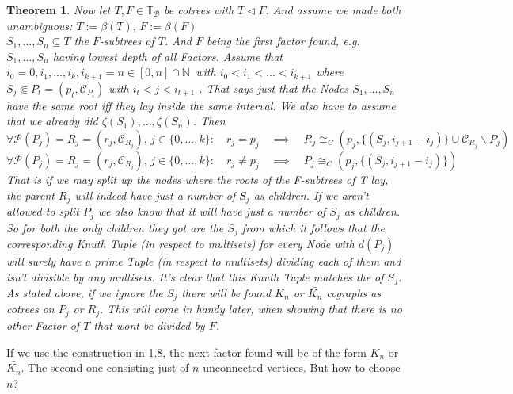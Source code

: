 \documentclass[a4paper,12pt]{article}
\newtheorem{theorem}{Theorem}[section]
\theoremstyle{definition}
\begin{document}
		\begin{theorem}
				Now let $T,F\in\mathds{T}_{\mathcal{B}} $ be cotrees with $T\vartriangleleft F$. And assume we made both unambiguous: $T:= \beta(T), \, F:=\beta(F)$\\ 	$S_1,...,S_n\subseteq T$ the $F$-subtrees of $T$. And $F$ being the first factor found, e.g. $S_1,...,S_n$ having lowest depth of all Factors. Assume that $i_0=0,i_1,...,i_k,i_{k+1}=n\in [0,n]\cap \mathds{N}\,$ with $i_0 < i_1 <...<i_{k+1}$ where  $S_j \Subset P_t =(p_t, \mathcal{C}_{P_t})$ with $i_t<j <i_{t+1}$ . That says just that the Nodes $S_1,...,S_n$ have the same root iff they lay inside the same interval. We also have to assume that we already did $\zeta(S_1),...,\zeta(S_n)$.
				Then \[\forall \mathcal{P}(P_j)=R_j=(r_j, \mathcal{C}_{R_j}),\,j\in \{0,...,k\}:\quad r_j = p_j\quad \implies \quad  R_j\cong_C(p_j, \{(S_j, i_{j+1} - i_j )\} \cup \mathcal{C}_{R_j}\backslash P_j) \]
				\[\forall \mathcal{P}(P_j)=R_j=(r_j, \mathcal{C}_{R_j}),\,j\in \{0,...,k\}:\quad r_j \not= p_j\quad \implies \quad  P_j\cong_C(p_j, \{(S_j, i_{j+1} - i_j )\}) \]
				That is if we may split up the nodes where the roots of the F-subtrees of T lay, the parent $R_j$ will indeed have just a number of $S_j$ as children.
				If we aren't allowed to split $P_j$ we also know that it will have just a number of $S_j$ as children. So for both the only children they got are the $S_j$ from which it follows that the corresponding Knuth Tuple (in respect to multisets) for every Node with $d(P_j)$ will surely have a prime Tuple (in respect to multisets) dividing each of them and isn't divisible by any multisets. It's clear that this Knuth Tuple matches the of $S_j$.\\
				As stated above, if we ignore the $S_j$ there will be found $K_n$ or $\bar{K_n}$ cographs as cotrees on $P_j$ or $R_j$. This will come in handy later, when showing that there is no other Factor of $T$ that wont be divided by $F$.
		\end{theorem}
	If we use the construction in 1.8, the next factor found will be of the form $K_n$ or $\bar{K_n}$. The second one consisting just of $n$ unconnected vertices. But how to choose $n$? \\
\end{document}
